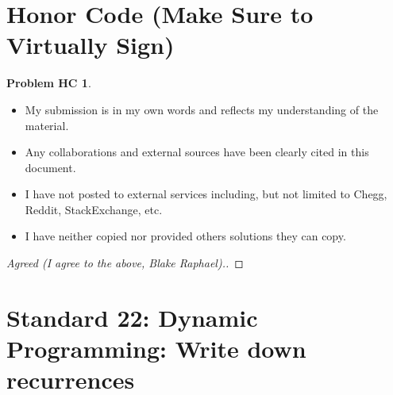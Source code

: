 \documentclass[11pt]{article}
\theoremstyle{definition}
\theoremstyle{definition}
\newtheorem*{requiredHC}{Problem HC}
\theoremstyle{definition}
\begin{document}
\newpage
\section*{Honor Code (Make Sure to Virtually Sign)} \label{HonorCode}
\hypertarget{HonorCode}{}

\begin{requiredHC}
\begin{itemize}
\item My submission is in my own words and reflects my understanding of the material.
\item Any collaborations and external sources have been clearly cited in this document.
\item I have not posted to external services including, but not limited to Chegg, Reddit, StackExchange, etc.
\item I have neither copied nor provided others solutions they can copy.
\end{itemize}

\end{requiredHC}

\begin{proof}[Agreed (I agree to the above, Blake Raphael).]
\end{proof}


\newpage
\setcounter{section}{21}
\section{Standard 22: Dynamic Programming: Write down recurrences}
\end{document}

